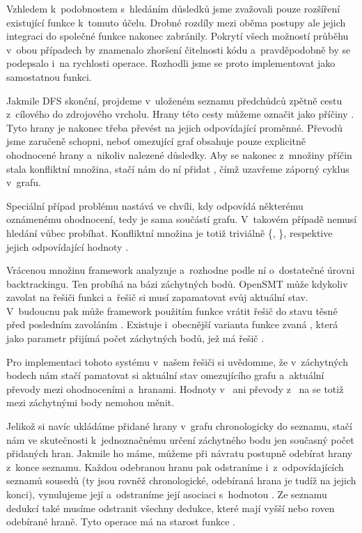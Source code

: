 Vzhledem k~podobnostem s~hledáním důsledků jsme zvažovali pouze rozšíření existující funkce  k~tomuto účelu. Drobné rozdíly mezi oběma postupy ale jejich integraci do společné funkce nakonec zabránily. Pokrytí všech možností průběhu v~obou případech by znamenalo zhoršení čitelnosti kódu a~pravděpodobně by se podepsalo i~na rychlosti operace. Rozhodli jsme se proto implementovat  jako samostatnou funkci.

Jakmile DFS skonční, projdeme v~uloženém seznamu předchůdců zpětně cestu z~cílového do zdrojového vrcholu. Hrany této cesty můžeme označit jako příčiny . Tyto hrany je nakonec třeba převést na jejich odpovídající  proměnné. Převodů jsme zaručeně schopni, neboť omezující graf obsahuje pouze explicitně ohodnocené hrany a~nikoliv nalezené důsledky. Aby se nakonec z~množiny příčin stala konfliktní množina, stačí nám do ní přidat , čímž uzavřeme záporný cyklus v~grafu. 

Speciální případ problému nastává ve chvíli, kdy  odpovídá některému oznámenému ohodnocení, tedy je sama součástí grafu. V~takovém případě nemusí hledání vůbec probíhat. Konfliktní množina je totiž triviálně \{, \}, respektive jejich odpovídající hodnoty .

Vrácenou množinu framework analyzuje a~rozhodne podle ní o~dostatečné úrovni backtrackingu. Ten probíhá na bázi záchytných bodů. OpenSMT může kdykoliv zavolat na řešiči funkci  a~řešič si musí zapamatovat svůj aktuální stav. V~budoucnu pak může framework použitím funkce  vrátit řešič do stavu těsně před posledním zavoláním . Existuje i~obecnější varianta funkce zvaná , která jako parametr přijímá počet záchytných bodů, jež má řešič .

Pro implementaci tohoto systému v~našem řešiči si uvědomme, že v~záchytných bodech nám stačí pamatovat si aktuální stav omezujícího grafu a~aktuální převody mezi ohodnoceními a~hranami. Hodnoty v~ ani převody z~ na  se totiž mezi záchytnými body nemohou měnit.

Jelikož si navíc ukládáme přidané hrany v~grafu chronologicky do seznamu, stačí nám ve skutečnosti k~jednoznačnému určení záchytného bodu jen současný počet přidaných hran. Jakmile ho máme, můžeme při návratu postupně odebírat hrany z~konce seznamu. Každou odebranou hranu pak odstraníme i~z~odpovídajících seznamů sousedů (ty jsou rovněž chronologické, odebíraná hrana je tudíž na jejich konci), vynulujeme její  a~odstraníme její asociaci s~hodnotou . Ze seznamu dedukcí také musíme odstranit všechny dedukce, které mají  vyšší nebo roven odebírané hraně.  Tyto operace má na starost funkce . 

